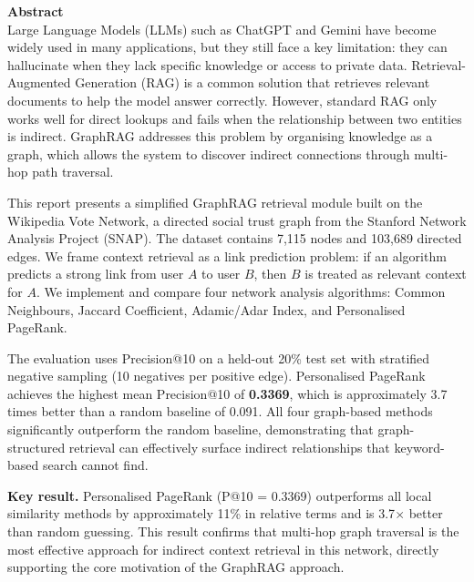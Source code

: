 \documentclass[10pt]{article}
\begin{document}
\newpage

\textbf{\Huge Abstract}\\[0.4cm]

\bigskip
Large Language Models (LLMs) such as ChatGPT and Gemini have become widely used in many applications, but they still face a key limitation: they can hallucinate when they lack specific knowledge or access to private data. Retrieval-Augmented Generation (RAG) is a common solution that retrieves relevant documents to help the model answer correctly. However, standard RAG only works well for direct lookups and fails when the relationship between two entities is indirect. GraphRAG addresses this problem by organising knowledge as a graph, which allows the system to discover indirect connections through multi-hop path traversal.

This report presents a simplified GraphRAG retrieval module built on the Wikipedia Vote Network, a directed social trust graph from the Stanford Network Analysis Project (SNAP). The dataset contains 7,115 nodes and 103,689 directed edges. We frame context retrieval as a link prediction problem: if an algorithm predicts a strong link from user $A$ to user $B$, then $B$ is treated as relevant context for $A$. We implement and compare four network analysis algorithms: Common Neighbours, Jaccard Coefficient, Adamic/Adar Index, and Personalised PageRank.

The evaluation uses Precision@10 on a held-out 20\% test set with stratified negative sampling (10 negatives per positive edge). Personalised PageRank achieves the highest mean Precision@10 of \textbf{0.3369}, which is approximately 3.7 times better than a random baseline of 0.091. All four graph-based methods significantly outperform the random baseline, demonstrating that graph-structured retrieval can effectively surface indirect relationships that keyword-based search cannot find.

\begin{successbox}
\textbf{Key result.} Personalised PageRank (P@10 = 0.3369) outperforms all local similarity methods by approximately 11\% in relative terms and is 3.7$\times$ better than random guessing. This result confirms that multi-hop graph traversal is the most effective approach for indirect context retrieval in this network, directly supporting the core motivation of the GraphRAG approach.
\end{successbox}

\newpage
\tableofcontents
\newpage
\end{document}

